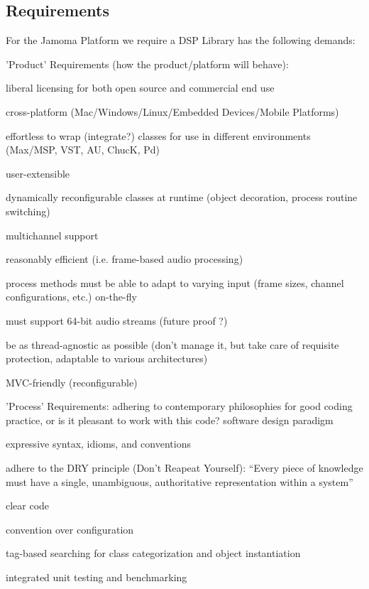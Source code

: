 \documentclass[twoside,10pt]{article}
\newenvironment{packed_item}{
\begin{itemize}
  \setlength{\itemsep}{1pt}
  \setlength{\parskip}{0pt}
  \setlength{\parsep}{0pt}
}{\end{itemize}}
\begin{document}
\subsection{Requirements}

For the Jamoma Platform we require a DSP Library has the following demands:

'Product' Requirements (how the product/platform will behave):
\begin{packed_item}%
	\item liberal licensing for both open source and commercial end use
	\item cross-platform (Mac/Windows/Linux/Embedded Devices/Mobile Platforms)
	
	\item effortless to wrap (integrate?) classes for use in different environments (Max/MSP, VST, AU, ChucK, Pd)
	\item user-extensible
	\item dynamically reconfigurable classes at runtime (object decoration, process routine switching)
	\item multichannel support
	\item reasonably efficient (i.e. frame-based audio processing)
	\item process methods must be able to adapt to varying input (frame sizes, channel configurations, etc.) on-the-fly
	\item must support 64-bit audio streams (future proof ?)
	\item be as thread-agnostic as possible (don't manage it, but take care of requisite protection, adaptable to various architectures)
	\item MVC-friendly (reconfigurable)
\end{packed_item}%


'Process' Requirements:  adhering to contemporary philosophies for good coding practice, or is it pleasant to work with this code? software design paradigm
\begin{packed_item}%
	\item expressive syntax, idioms, and conventions
	\item adhere to the DRY principle (Don't Reapeat Yourself): ``Every piece of knowledge must have a single, unambiguous, authoritative representation within a system''\cite{Hunt:1999}
	\item clear code %
	\item convention over configuration
	\item tag-based searching for class categorization and object instantiation
	\item integrated unit testing and benchmarking %

\end{packed_item}%
\end{document}
